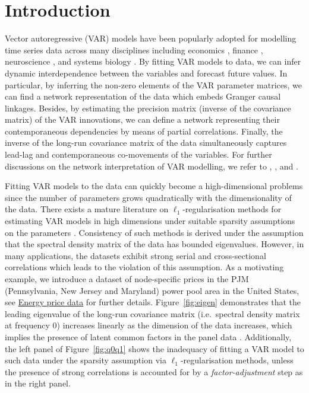 \section{Introduction}

Vector autoregressive (VAR) models have been popularly adopted for modelling time series data across many disciplines including economics \citep{koop2013forecasting}, finance \citep{barigozzi2019nets}, neuroscience \citep{kirch2015eeg}, and systems biology \citep{shojaie2010discovering}.
By fitting VAR models to data, we can infer dynamic interdependence between the variables and forecast future values.
In particular, by inferring the non-zero elements of the VAR parameter matrices, we can find a network representation of the data which embeds Granger causal linkages.
Besides, by estimating the precision matrix (inverse of the covariance matrix) of the VAR innovations, we can define a network representing their contemporaneous dependencies by means of partial correlations.
Finally, the inverse of the long-run covariance matrix of the data simultaneously captures lead-lag and contemporaneous co-movements of the variables. 
For further discussions on the network interpretation of VAR modelling, we refer to
\cite{dahlhaus2000graphical}, \cite{eichler2007granger}, \cite{billio2012econometric} and \cite{barigozzi2019nets}.

Fitting VAR models to the data can quickly become a high-dimensional problems since the number of parameters grows quadratically with the dimensionality of the data.
There exists a mature literature on $\ell_1$-regularisation methods for estimating VAR models in high dimensions under suitable sparsity assumptions on the parameters
\citep{basu2015regularized, han2015direct, kock2015oracle, medeiros2016, nicholson2020high, liu2021robust}.
Consistency of such methods is derived under the assumption that the spectral density matrix of the data has bounded eigenvalues.
However, in many applications, the datasets exhibit strong serial and cross-sectional correlations which leads to the violation of this assumption.
As a motivating example, we introduce a dataset of node-specific prices in the PJM (Pennsylvania, New Jersey and Maryland) power pool area in the United States, see \hyperref[sec:real:energy]{Energy price data} for further details.
Figure~\ref{fig:eigen} demonstrates that the leading eigenvalue of the long-run covariance matrix (i.e.\ spectral density matrix at frequency $0$) increases linearly as the dimension of the data increases, which implies the presence of latent common factors in the panel data \citep{forni2000generalized}.
Additionally, the left panel of Figure~\ref{fig:q0q1} shows the inadequacy of fitting a VAR model to such data under the sparsity assumption via $\ell_1$-regularisation methods, unless the presence of strong correlations is accounted for by a {\it factor-adjustment} step as in the right panel.

